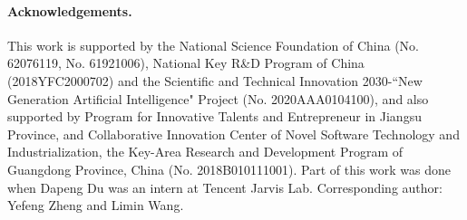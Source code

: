 \paragraph{\bf Acknowledgements.} This work is supported by the National Science Foundation of China (No. 62076119, No. 61921006), National Key R\&D Program of China (2018YFC2000702) and the Scientific and Technical Innovation 2030-``New Generation Artificial Intelligence" Project (No. 2020AAA0104100), and also supported by Program for Innovative Talents and Entrepreneur in Jiangsu Province, and Collaborative Innovation Center of Novel Software Technology and Industrialization, the Key-Area Research and Development Program of Guangdong Province, China (No. 2018B010111001). Part of this work was done when Dapeng Du was an intern at Tencent Jarvis Lab. Corresponding author: Yefeng Zheng and Limin Wang.


%
%



%



